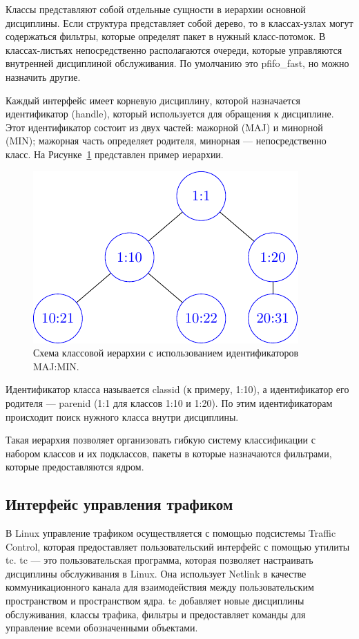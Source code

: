 	Классы представляют собой отдельные сущности в иерархии основной дисциплины.
	Если структура представляет собой дерево, то в классах-узлах могут содержаться
	фильтры, которые определят пакет в нужный класс-потомок. В классах-листьях
	непосредственно располагаются очереди, которые управляются внутренней дисциплиной
	обслуживания. По умолчанию это pfifo\_fast, но можно назначить другие. 

	Каждый интерфейс имеет корневую дисциплину, которой
	назначается идентификатор (handle), который используется для обращения к дисциплине.
	Этот идентификатор состоит из двух частей: мажорной (MAJ) и минорной (MIN); мажорная
	часть определяет родителя, минорная --- непосредственно класс. На Рисунке~\ref{pic:clheirh}
	представлен пример иерархии.

	\begin{figure}[ht!]
		\centering
		\includegraphics[scale=1.3]{./pdfimages/class_hierh.pdf}
		\caption{Схема классовой иерархии с использованием идентификаторов MAJ:MIN.}
		\label{pic:clheirh}
	\end{figure}

	Идентификатор класса называется classid (к примеру, 1:10),
	а идентификатор его родителя --- parenid (1:1 для классов 1:10 и 1:20). По этим
	идентификаторам происходит поиск нужного класса внутри дисциплины.

	Такая иерархия позволяет организовать гибкую систему классификации с набором классов
	и их подклассов, пакеты в которые назначаются фильтрами, которые предоставляются ядром.

	\subsection{Интерфейс управления трафиком}

	В Linux управление трафиком осуществляется с помощью подсистемы Traffic Control,
	которая предоставляет пользовательский интерфейс с помощью утилиты {tc}.
	{tc} --- это пользовательская программа, которая позволяет настраивать
	дисциплины обслуживания в Linux. Она использует Netlink в качестве
	коммуникационного канала для взаимодействия между пользовательским
	пространством и пространством ядра. {tc} добавляет новые дисциплины
	обслуживания, классы трафика, фильтры и предоставляет команды для
	управление всеми обозначенными объектами.\cite{tcpip}

